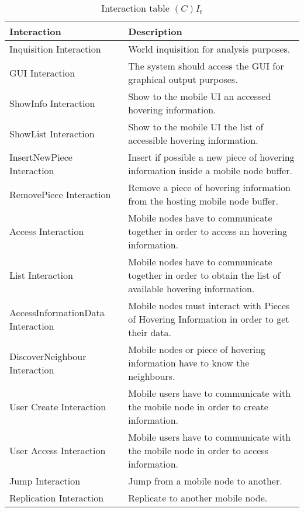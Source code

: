 \begin{table}[H]
	\centering
	\begin{tabular}{|p{4cm}|p{8cm}|}
			\hline
			\textbf{Interaction} & \textbf{Description} \\
			\hline
			Inquisition Interaction & World inquisition for analysis purposes. \\
			\hline
			GUI Interaction & The system should access the GUI for graphical output
			purposes. \\
			\hline
			ShowInfo Interaction & Show to the mobile UI an accessed hovering
			information. \\
			\hline
			ShowList Interaction & Show to the mobile UI the list of accessible hovering
			information. \\
			\hline
			InsertNewPiece Interaction & Insert if possible a new piece of hovering
			information inside a mobile node buffer. \\
			\hline
			RemovePiece Interaction & Remove a piece of hovering information from the
			hosting mobile node buffer. \\
			\hline
			Access Interaction & Mobile nodes have to communicate together in order to
			access an hovering information. \\
			\hline
			List Interaction & Mobile nodes have to communicate together in order to
			obtain the list of available hovering information. \\
			\hline
			AccessInformationData Interaction & Mobile nodes must interact with Pieces
			of Hovering Information in order to get their data. \\
			\hline
			DiscoverNeighbour Interaction & Mobile nodes or piece of hovering
			information have to know the neighbours. \\
			\hline
			User Create Interaction & Mobile users have to communicate with the
			mobile node in order to create information. \\
			\hline
			User Access Interaction & Mobile users have to communicate with the
			mobile node in order to access information. \\
			\hline
			Jump Interaction & Jump from a mobile node to another. \\
			\hline
			Replication Interaction & Replicate to another mobile node. \\
			\hline
		\end{tabular}
	\caption{Interaction table $(C)I_t$}
	\label{tab:cit}
\end{table}

